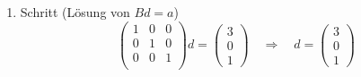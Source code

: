 \documentclass[a4paper]{scrartcl}
\begin{document}
\begin{enumerate}[label=\bfseries\arabic*.]
\begin{enumerate}
\begin{enumerate}[1.]
\begin{enumerate}[1.]
                            \item Schritt (Lösung von $Bd = a$)
                                \begin{equation}
                                    \begin{pmatrix}
                                        1 & 0 & 0 \\
                                        0 & 1 & 0 \\
                                        0 & 0 & 1 \\
                                    \end{pmatrix}
                                    d
                                    =
                                    \begin{pmatrix}
                                        3 \\ 0 \\ 1
                                    \end{pmatrix}
                                    \quad\Rightarrow\quad
                                    d =
                                    \begin{pmatrix}
                                        3 \\ 0 \\ 1
                                    \end{pmatrix}
                                \end{equation}


\end{enumerate}
\end{enumerate}
\end{enumerate}
\end{enumerate}
\end{document}
